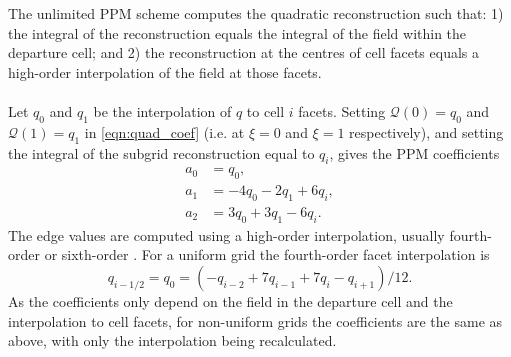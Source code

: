 \documentclass{ametsocV6.1}
\begin{document}
The unlimited PPM scheme \citep{colella1984ppm} computes the quadratic reconstruction such that: 1) the integral of the reconstruction equals the integral of the field within the departure cell; and 2) the reconstruction at the centres of cell facets equals a high-order interpolation of the field at those facets. \\
\\
Let $q_0$ and $q_1$ be the interpolation of $q$ to cell $i$ facets. Setting $\mathcal{Q}(0)=q_0$ and $\mathcal{Q}(1) = q_1$ in \eqref{eqn:quad_coef} (i.e. at $\xi=0$ and $\xi=1$ respectively), and setting the integral of the subgrid reconstruction equal to $q_i$, gives the PPM coefficients
\begin{subequations}
\begin{align}
    a_0 &= q_0, \\
    a_1 &= -4 q_0 - 2 q_1 + 6 q_i, \\
    a_2 &= 3 q_0 + 3 q_1 - 6 q_i.
\end{align}
\end{subequations}
The edge values are computed using a high-order interpolation, usually fourth-order \citep{colella1984ppm} or sixth-order \citep{colella2008}.
For a uniform grid the fourth-order facet interpolation is
\begin{equation}
    q_{i-1/2} = q_0 = \left( -q_{i-2} + 7 q_{i-1} + 7 q_{i} - q_{i+1}\right)/12.
\end{equation}
As the coefficients only depend on the field in the departure cell and the interpolation to cell facets, for non-uniform grids the coefficients are the same as above, with only the interpolation being recalculated.  
\end{document}
